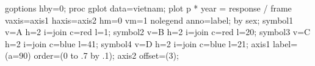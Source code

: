 \begin{listing}
goptions hby=0;
proc gplot data=vietnam;
   plot p * year = response / 
      frame vaxis=axis1 haxis=axis2 hm=0 vm=1 nolegend anno=label;
   by sex;
   symbol1 v=A h=2 i=join c=red  l=1;
   symbol2 v=B h=2 i=join c=red  l=20;
   symbol3 v=C h=2 i=join c=blue l=41;
   symbol4 v=D h=2 i=join c=blue l=21;
   axis1 label=(a=90) order=(0 to .7 by .1);
   axis2 offset=(3);
\end{listing}
